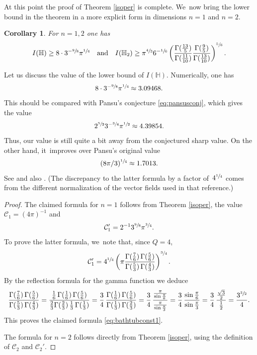 \documentclass[11pt]{article}
\let\oldsfrac\sfrac
\renewcommand{\sfrac}[2]{{\oldsfrac{#1}{#2}}}
\newtheorem{corollary}[theorem]{Corollary}
\theoremstyle{definition}
\newcommand{\1}{\mathbbm{1}}
\numberwithin{equation}{section}
\begin{document}
At this point the proof of Theorem \ref{isoper} is complete. We~now bring the lower bound in the theorem in a more explicit form in dimensions $n=1$ and $n=2$.

\begin{corollary}\label{isopercor}
For $n=1,2$ one has\vspace*{-3pt}
\[
I(\mathbb H)\geq 8 \cdot 3^{-\sfrac 98} \pi^{\sfrac14}
\quad\text{and}\quad
I(\mathbb H_2) \geq \pi^\sfrac43 6^{-\sfrac16} \left(\frac{\Gamma(\frac{13}{5})}{\Gamma(\frac{11}{10})} \frac{\Gamma(\frac{9}{5})}{\Gamma(\frac{13}{10})}\right)^{\sfrac{5}{6}}.
\]
\end{corollary}

Let us discuss the value of the lower bound of $I(\mathbb H)$. Numerically, one has\vspace*{-3pt}
\[
8 \cdot 3^{-\sfrac 98} \pi^{\sfrac14} \approx 3.09468.
\]
This should be compared with Pansu's conjecture \eqref{eq:pansusconj}, which gives the value\vspace*{-3pt}
\begin{equation}
\label{eq:pansun1}
2^{\sfrac52} 3^{-\sfrac34} \pi^{\sfrac12} \approx 4.39854.
\end{equation}
Thus, our value is still quite a bit away from the conjectured sharp value. On the other hand, it~improves over Pansu's original value\vspace*{-3pt}
\[(
8\pi/3)^\sfrac14\approx1.7013.
\]
See \cite{Pa} and also \cite[(7.15)]{CaDaPaTy}. (The discrepancy to the latter formula by a factor of~$4^\sfrac14$ comes from the different normalization of the vector fields used in that reference.)

\begin{proof}
The claimed formula for $n=1$ follows from Theorem \ref{isoper}, the value $\mathcal C_1=(4\pi)^{-1}$ and
\begin{equation}\label{eq:bathtubconst1}
\mathcal C_1' = 2^{-1} 3^\sfrac 98 \pi^\sfrac34.
\end{equation}
To prove the latter formula, we~note that, since $Q=4$,
\[
\mathcal C_1' = 4^\sfrac14 \left(\pi \frac{\Gamma(\frac 76) \,\Gamma(\frac 56)}{\Gamma(\frac{5}{3})\,\Gamma(\frac 43)}\right)^\sfrac34.
\]
By the reflection formula for the gamma function we deduce
\[
\frac{\Gamma(\frac 76) \,\Gamma(\frac 56)}{\Gamma(\frac{5}{3})\,\Gamma(\frac 43)}
= \frac{\frac16\,\Gamma(\frac16)\,\Gamma(\frac56)}{\frac23 \Gamma(\frac23)\,\frac13\,\Gamma(\frac13)} = \frac{3}{4} \,\frac{\Gamma(\frac16)\,\Gamma(\frac56)}{\Gamma(\frac13)\,\Gamma(\frac23)} = \frac34 \,\frac{\frac{\pi}{\sin\frac\pi 6}}{\frac{\pi}{\sin\frac\pi3}} = \frac34\,\frac{\sin\frac\pi6}{\sin\frac\pi3} = \frac34\,\frac{\frac{\sqrt 3}2}{\frac12} = \frac{3^\sfrac32}{4}.
\]
This proves the claimed formula \eqref{eq:bathtubconst1}.

The formula for $n=2$ follows directly from Theorem \ref{isoper}, using the definition of $\mathcal C_2$ and $\mathcal C_2'$.
\end{proof}
\end{document}
